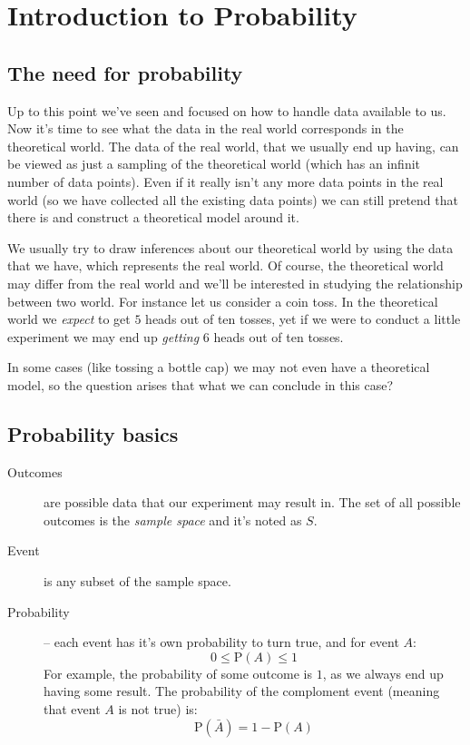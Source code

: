 \section{Introduction to Probability}

\subsection{The need for probability}

Up to this point we've seen and focused on how to handle data available to us.
Now it's time to see what the data in the real world corresponds in the
theoretical world. The data of the real world, that we usually end up having,
can be viewed as just a sampling of the theoretical world (which has an
infinit number of data points). Even if it really isn't any more data points in
the real world (so we have collected all the existing data points) we can still
pretend that there is and construct a theoretical model around it.

We usually try to draw inferences about our theoretical world by using the data
that we have, which represents the real world. Of course, the theoretical world
may differ from the real world and we'll be interested in studying the
relationship between two world. For instance let us consider a coin toss. In the
theoretical world we \emph{expect} to get $5$ heads out of ten tosses, yet if we
were to conduct a little experiment we may end up \emph{getting} $6$ heads out
of ten tosses.

In some cases (like tossing a bottle cap) we may not even have a theoretical
model, so the question arises that what we can conclude in this case? 

\subsection{Probability basics}

\begin{description}
  \item[Outcomes] are possible data that our experiment may result in. The set
  of all possible outcomes is the \emph{sample space} and it's noted as $S$.
  \item[Event] is any subset of the sample space.
  \item[Probability] -- each event has it's own probability to turn true, and
  for event $A$:
  \[
  0 \leq \mbox{P}(A) \leq 1 
  \]
  For example, the probability of some outcome is $1$, as we always end up
  having some result. The probability of the comploment event (meaning that
  event $A$ is not true) is:
 \[
  \mbox{P}(\bar{A}) = 1 - \mbox{P}(A)
 \] 
\end{description}

